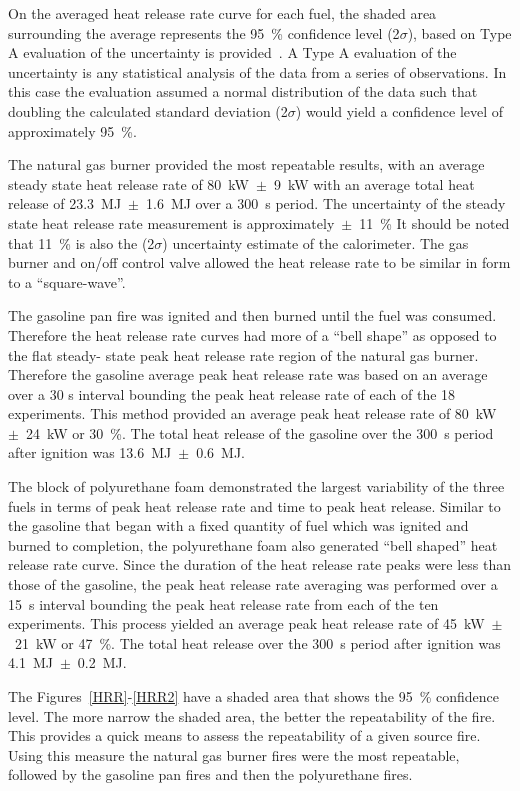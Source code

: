 \documentclass[twoside]{uocthesis}
\begin{document}
{On the averaged heat release rate curve for each fuel, the shaded area surrounding the average represents the 95~\% confidence level (2$\sigma$), based on Type A evaluation of the uncertainty is provided~\cite{Taylor:1994}.  A Type A evaluation of the uncertainty is any statistical analysis of the data from a series of observations.  In this case the evaluation assumed a normal distribution of the data such that doubling the calculated standard deviation (2$\sigma$) would yield a confidence level of approximately 95~\%.

The natural gas burner provided the most repeatable results, with an average steady state heat release rate of 80~kW~$\pm$~9~kW with an average total heat release of 23.3~MJ~$\pm$~1.6~MJ over a 300~s period. The uncertainty of the steady state heat release rate measurement is approximately~$\pm$~11~\% It should be noted that 11~\% is also the (2$\sigma$) uncertainty estimate of the calorimeter. The gas burner and on/off control valve allowed the heat release rate to be similar in form to a ``square-wave''. 

The gasoline pan fire was ignited and then burned until the fuel was consumed.  Therefore the heat release rate curves had more of a ``bell shape''  as opposed to the flat steady- state peak heat release rate region of the natural gas burner.  Therefore the  gasoline average peak heat release rate was based on an average over a 30 s interval bounding the peak heat release rate of each of the 18 experiments.  This method provided an average peak heat release rate of 80~kW~$\pm$~24~kW or 30~\%.  The total heat release of the gasoline over the 300~s period after ignition was 13.6~MJ~$\pm$~0.6~MJ.  

The block of polyurethane foam demonstrated the largest variability of the three fuels in terms of peak heat release rate and time to peak heat release. Similar to the gasoline that began with a fixed quantity of fuel which was ignited and burned to completion, the polyurethane foam also generated ``bell shaped'' heat release rate curve.  Since the duration of the heat release rate peaks were less than those of the gasoline, the peak heat release rate averaging was performed over a 15~s interval bounding the peak heat release rate from each of the ten experiments.  This process yielded an average peak heat release rate of 45~kW~$\pm$~21~kW or 47~\%.  The total heat release over the 300~s period after ignition was 4.1~MJ~$\pm$~0.2~MJ. 

The Figures~\ref{HRR}-\ref{HRR2} have a shaded area that shows the 95~\% confidence level.  The more narrow the shaded area, the better the repeatability of the fire.  This provides a quick means to assess the repeatability of a given source fire.  Using this measure the natural gas burner fires were the most repeatable, followed by the gasoline pan fires and then the polyurethane fires.       


}
\end{document}

